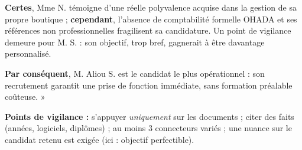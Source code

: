 \documentclass[11pt]{article}
\begin{document}
\begin{corrige}
\textbf{Certes}, Mme N. témoigne d'une réelle polyvalence acquise dans la gestion de sa propre boutique ; \textbf{cependant}, l'absence de comptabilité formelle OHADA et ses références non professionnelles fragilisent sa candidature. Un point de vigilance demeure pour M. S. : son objectif, trop bref, gagnerait à être davantage personnalisé.

\textbf{Par conséquent}, M. Aliou S. est le candidat le plus opérationnel : son recrutement garantit une prise de fonction immédiate, sans formation préalable coûteuse. »

\textbf{Points de vigilance :} s'appuyer \emph{uniquement} sur les documents ; citer des faits (années, logiciels, diplômes) ; au moins 3 connecteurs variés ; une nuance sur le candidat retenu est exigée (ici : objectif perfectible).
\end{corrige}
\end{document}
